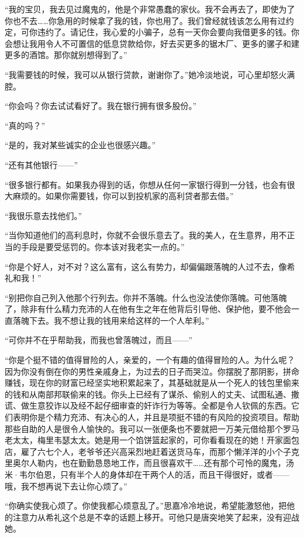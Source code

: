 \par “我的宝贝，我去见过魔鬼的，他是个非常愚蠢的家伙。我不会再去了，即使为了你也不去……你急用的时候拿了我的钱，你也用了。我们曾经就钱该怎么用有过约定，可你违约了。请记住，我心爱的小骗子，总有一天你会要向我借更多的钱。你会想让我用令人不可置信的低息贷款给你，好去买更多的锯木厂、更多的骡子和建更多的酒馆。那你就别想得到了。”
\par “我需要钱的时候，我可以从银行贷款，谢谢你了。”她冷淡地说，可心里却怒火满腔。
\par “你会吗？你去试试看好了。我在银行拥有很多股份。”
\par “真的吗？”
\par “是的，我对某些诚实的企业也很感兴趣。”
\par “还有其他银行——”
\par “很多银行都有。如果我办得到的话，你想从任何一家银行得到一分钱，也会有很大麻烦的。如果你需要钱，你可以到投机家的高利贷者那去借。”
\par “我很乐意去找他们。”
\par “当你知道他们的高利息时，你就不会很乐意去了。我的美人，在生意界，用不正当的手段是要受惩罚的。你本该对我老实一点的。”
\par “你是个好人，对不对？这么富有，这么有势力，却偏偏跟落魄的人过不去，像希礼和我！”
\par “别把你自己列入他那个行列去。你并不落魄。什么也没法使你落魄。可他落魄了，除非有什么精力充沛的人在他有生之年在他背后引导他、保护他，要不他会一直落魄下去。我不想让我的钱用来给这样的一个人牟利。”
\par “可你并不在乎帮助我，而我也曾落魄过，而且——”
\par “你是个挺不错的值得冒险的人，亲爱的，一个有趣的值得冒险的人。为什么呢？因为你没有倒在你的男性亲戚身上，为过去的日子而哭泣。你摆脱了那阴影，拼命赚钱，现在你的财富已经坚实地积累起来了，其基础就是从一个死人的钱包里偷来的钱和从南部邦联偷来的钱。你头上已经有了谋杀、偷别人的丈夫、试图私通、撒谎、做生意狡诈以及经不起仔细审查的奸诈行为等等。全都是令人钦佩的东西。它们表明你是个精力充沛、有决心的人，并且是项挺不错的有风险的投资项目。帮助那些自助的人是很令人愉快的。我可以一张便条也不要就把一万美元借给那个罗马老太太，梅里韦瑟太太。她是用一个馅饼篮起家的，可你看看现在的她！开家面包店，雇了六七个人，老爷爷还兴高采烈地赶着送货马车，而那个懒洋洋的小个子克里奥尔人勒内，也在勤勤恳恳地工作，而且很喜欢干……还有那个可怜的魔鬼，汤米·韦尔伯恩，只有半个人的身体却在干两个人的活，而且干得很好，或者——哦，我不想再说下去让你心烦了。”
\par “你确实使我心烦了。你使我都心烦意乱了。”思嘉冷冷地说，希望能激怒他，把他的注意力从希礼这个总是不幸的话题上移开。可他只是唐突地笑了起来，没有迎战她。
